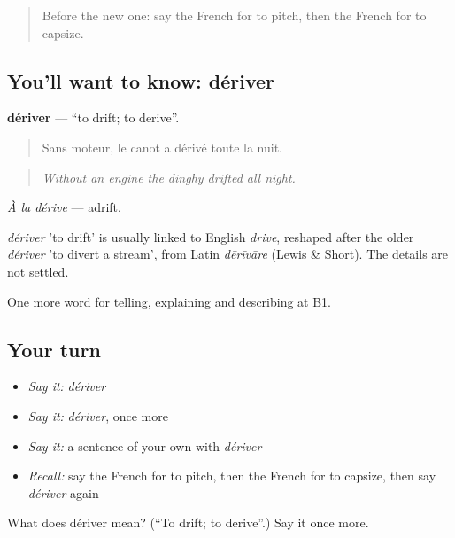 \label{lesson:FR-C423-deriver}



\begin{quote}
Before the new one: say the French for to pitch, then the French for to capsize.
\end{quote}

\subsection*{You'll want to know: dériver}
\textbf{dériver} — \textquotedblleft{}to drift; to derive\textquotedblright{}.

\begin{quote}
Sans moteur, le canot a dérivé toute la nuit.
\end{quote}

\begin{quote}
\emph{Without an engine the dinghy drifted all night.}
\end{quote}

\emph{À la dérive} — adrift.

\begin{cousinweb}
\emph{dériver} 'to drift' is usually linked to English \emph{drive}, reshaped after the older \emph{dériver} 'to divert a stream', from Latin \emph{dērīvāre} (Lewis \& Short). The details are not settled.
\end{cousinweb}

\begin{grammarlens}[title={What you've built}]
One more word for telling, explaining and describing at B1.
\end{grammarlens}

\subsection*{Your turn}
\begin{itemize}
\raggedright
  \item \emph{Say it:} \emph{dériver}
  \item \emph{Say it:} \emph{dériver}, once more
  \item \emph{Say it:} a sentence of your own with \emph{dériver}
  \item \emph{Recall:} say the French for to pitch, then the French for to capsize, then say \emph{dériver} again
\end{itemize}

\begin{tcolorbox}[breakable,colback=teal!4,colframe=teal!35!black,title={Before you move on}]
What does dériver mean? (\textquotedblleft{}To drift; to derive\textquotedblright{}.) Say it once more.
\end{tcolorbox}
